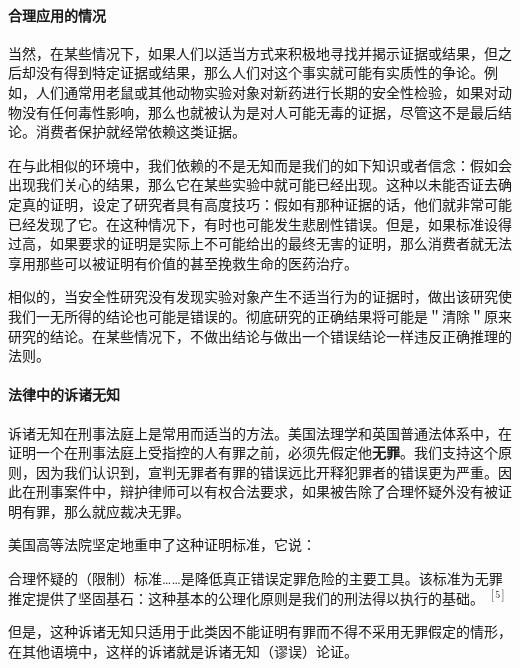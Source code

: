 \paragraph{合理应用的情况}
当然，在某些情况下，如果人们以适当方式来积极地寻找并揭示证据或结果，但之后却没有得到特定证据或结果，那么人们对这个事实就可能有实质性的争论。例如，人们通常用老鼠或其他动物实验对象对新药进行长期的安全性检验，如果对动物没有任何毒性影响，那么也就被认为是对人可能无毒的证据，尽管这不是最后结论。消费者保护就经常依赖这类证据。

在与此相似的环境中，我们依赖的不是无知而是我们的如下知识或者信念：假如会出现我们关心的结果，那么它在某些实验中就可能已经出现。这种以未能否证去确定真的证明，设定了研究者具有高度技巧：假如有那种证据的话，他们就非常可能已经发现了它。在这种情况下，有时也可能发生悲剧性错误。但是，如果标准设得过高，如果要求的证明是实际上不可能给出的最终无害的证明，那么消费者就无法享用那些可以被证明有价值的甚至挽救生命的医药治疗。

相似的，当安全性研究没有发现实验对象产生不适当行为的证据时，做出该研究使我们一无所得的结论也可能是错误的。彻底研究的正确结果将可能是＂清除＂原来研究的结论。在某些情况下，不做出结论与做出一个错误结论一样违反正确推理的法则。

\paragraph{法律中的诉诸无知}
诉诸无知在刑事法庭上是常用而适当的方法。美国法理学和英国普通法体系中，在证明一个在刑事法庭上受指控的人有罪之前，必须先假定他\textbf{无罪}。我们支持这个原则，因为我们认识到，宣判无罪者有罪的错误远比开释犯罪者的错误更为严重。因此在刑事案件中，辩护律师可以有权合法要求，如果被告除了合理怀疑外没有被证明有罪，那么就应裁决无罪。

美国高等法院坚定地重申了这种证明标准，它说：

合理怀疑的（限制）标准……是降低真正错误定罪危险的主要工具。该标准为无罪推定提供了坚固基石：这种基本的公理化原则是我们的刑法得以执行的基础。 ${ }^{[5]}$

但是，这种诉诸无知只适用于此类因不能证明有罪而不得不采用无罪假定的情形，在其他语境中，这样的诉诸就是诉诸无知（谬误）论证。 